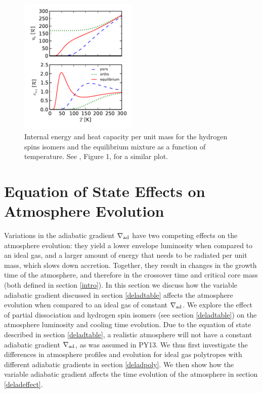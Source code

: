 \documentclass[apj]{emulateapj}
\newcommand{\delad}{\nabla_{\rm ad}}
\begin{document}
\begin{figure}[h]
\centering
\includegraphics[width=0.5\textwidth]{../../figs/ModelAtmospheres/RadSelfGravRealEOS/EOSeffects/ortho_para_energy.pdf}
\caption{Internal energy and heat capacity per unit mass for the hydrogen spins isomers and the equilibrium mixture as a function of temperature. See \citet{farkas35}, Figure 1, for a similar plot.}
\label{fig:ucvr}
\end{figure}




\section{Equation of State Effects on Atmosphere Evolution}
\label{EOSeffects}

Variations in the adiabatic gradient $\delad$ have two competing effects on the atmosphere evolution: they yield a lower envelope luminosity when compared to an ideal gas, and a larger amount of energy that needs to be radiated per unit mass, which slows down accretion. Together, they result in changes in the growth time of the atmosphere, and therefore in the crossover time and critical core mass (both defined in section \ref{intro}). In this section we discuss how the variable adiabatic gradient discussed in section \ref{deladtable} affects the atmosphere evolution when compared to an ideal gas of constant $\delad$. We explore the effect of partial dissociation and hydrogen spin isomers (see section \ref{deladtable}) on the atmosphere luminosity and cooling time evolution. Due to the equation of state described in section \ref{deladtable}, a realistic atmosphere will not have a constant adiabatic gradient $\delad$, as was assumed in PY13. We thus first investigate the differences in atmosphere profiles and evolution for ideal gas polytropes with different adiabatic gradients in section \ref{deladpoly}. We then show how the variable adiabatic gradient affects the time evolution of the atmosphere in section \ref{deladeffect}.
\end{document}
